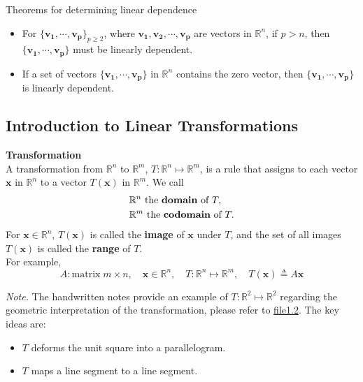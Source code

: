 \documentclass[10pt, a4paper]{article}
\begin{document}
\begin{proposition} Theorems for determining linear dependence
    \begin{itemize}
        \item For $\{\mathbf{v_1}, \cdots, \mathbf{v_p}\}_{p\geq 2}$, where $\mathbf{v_1}, \mathbf{v_2}, \cdots, \mathbf{v_p}$ are vectors in $\mathbb{R}^n$, if \textbf{$p>n$}, then $\{\mathbf{v_1}, \cdots, \mathbf{v_p}\}$ must be linearly dependent.
        \item If a set of vectors $\{\mathbf{v_1}, \cdots, \mathbf{v_p}\}$ in $\mathbb{R}^n$ contains the zero vector, then $\{\mathbf{v_1}, \cdots, \mathbf{v_p}\}$ is linearly dependent.
    \end{itemize}
\end{proposition}

\subsection{Introduction to Linear Transformations}
\begin{definition}
    \textbf{Transformation}\\
    A transformation from $\mathbb{R}^n$ to $\mathbb{R}^m$, $T: \mathbb{R}^n \mapsto \mathbb{R}^m$, is a rule that assigns to each vector $\mathbf{x}$ in $\mathbb{R}^n$ to a vector $T(\mathbf{x})$ in $\mathbb{R}^m$. We call 
    \begin{align*}
        &\mathbb{R}^n \text{ the \textbf{domain} of } T, \\
        &\mathbb{R}^m \text{ the \textbf{codomain} of } T.
    \end{align*}
    For $\mathbf{x}\in\mathbb{R}^n$, $T(\mathbf{x})$ is called the \textbf{image} of $\mathbf{x}$ under $T$, and the set of all images $T(\mathbf{x})$ is called the \textbf{range} of $T$.
    \\
    For example, \[
    A: \text{matrix}\; m\times n , \quad \mathbf{x}\in \mathbb{R}^n, \quad T: \mathbb{R}^n \mapsto \mathbb{R}^m, \quad T(\mathbf{x})\triangleq A\mathbf{x}
    \]
\end{definition}
\indent \textit{Note.} The handwritten notes provide an example of $T: \mathbb{R}^2 \mapsto \mathbb{R}^2$ regarding the geometric interpretation of the transformation, please refer to \href{run: file1.2.pdf}{file1.2}. The key ideas are:
\begin{itemize}
    \item $T$ deforms the unit square into a parallelogram.
    \item $T$ maps a line segment to a line segment.
\end{itemize}
\end{document}
